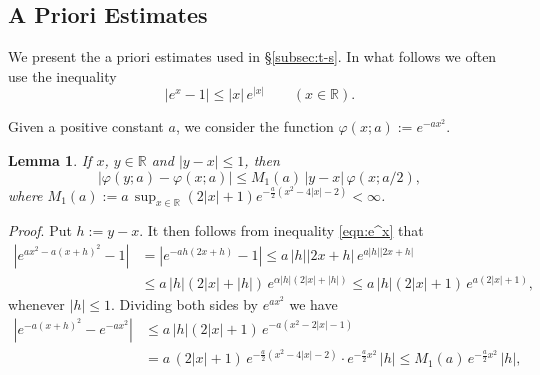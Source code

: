 \documentclass[a4paper,12pt]{article}
\theoremstyle{plain}
\newtheorem{lemma}[theorem]{Lemma}
\def\R{\mathbb{R}}
\def\ds{\displaystyle}
\begin{document}
\subsection{A Priori Estimates} \label{subsec:apriori} 
We present the a priori estimates used in \S \ref{subsec:t-s}. 
In what follows we often use the inequality   
\begin{equation} \label{eqn:e^x}
|e^x -1 | \le |x| \, e^{|x|} \qquad (x \in \R). 
\end{equation}
\par
Given a positive constant $a$, we consider the function  
$\varphi(x; a) := e^{-a x^2}$.  
\begin{lemma} \label{lem:Lipschitz} 
If $x$, $y \in \R$ and $| y-x | \le 1$, then   
\begin{equation} \label{eqn:Lipschitz}
| \varphi( y; a) - \varphi( x; a ) | \le M_1( a ) \, 
|y-x| \, \varphi( x; a/2 ),     
\end{equation}
where $M_1(a) := a \, \ds \sup_{x \in \R} (2 |x| +1) 
e^{-\frac{a}{2} (x^2 - 4|x|-2)} < \infty$. 
\end{lemma}
{\it Proof}. 
Put $h := y-x$. 
It then follows from inequality \eqref{eqn:e^x} that  
\[
\begin{split}
\left| e^{a x^2 - a (x+h)^2} -1 \right| 
&= \left| e^{-a h (2 x + h)} -1 \right| \le a \, 
|h||2 x + h| \, e^{a |h||2 x + h|} \\
&\le a \, |h| \left( 2 |x| + |h| \right) \, 
e^{\alpha |h|(2|x| + |h|)} \le a \, |h| 
\left( 2 |x| + 1 \right) \, e^{a (2|x| + 1) },   
\end{split}
\]
whenever $|h| \le 1$.  
Dividing both sides by $e^{a x^2}$ we have 
\[
\begin{split}
\left| e^{- a (x+h)^2} - e^{- a x^2} \right|
&\le a \, |h| \left( 2 |x| + 1 \right) \, e^{-a (x^2 -2|x| - 1) } \\ 
&= a \, \left( 2 |x| + 1 \right) \, e^{-\frac{a}{2} (x^2 -4|x| - 2) } 
\cdot e^{- \frac{a}{2} x^2} \, |h| \le M_1(a) \, 
e^{- \frac{a}{2} x^2} \, |h|,      
\end{split}
\]
\end{document}
